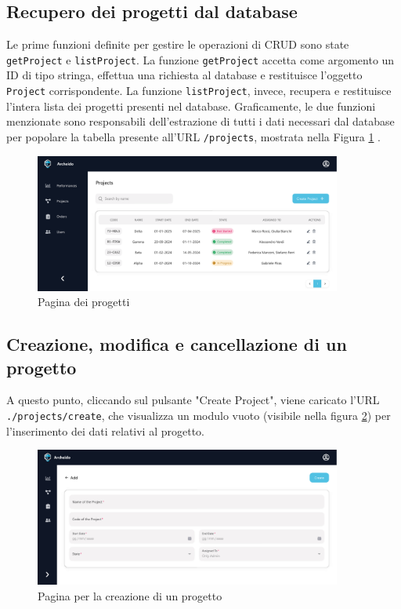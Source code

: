 \documentclass[target=bach,aauheader=,style=]{thud}
\begin{document}
\subsection{Recupero dei progetti dal database}
\noindent Le prime funzioni definite per gestire le operazioni di CRUD sono state \texttt{getProject} e \texttt{listProject}. La funzione \texttt{getProject} accetta come argomento un ID di tipo stringa, effettua una richiesta al database e restituisce l'oggetto \texttt{Project} corrispondente. La funzione \texttt{listProject}, invece, recupera e restituisce l'intera lista dei progetti presenti nel database. Graficamente, le due funzioni menzionate sono responsabili dell'estrazione di tutti i dati necessari dal database per popolare la tabella presente all'URL \texttt{/projects}, mostrata nella Figura \ref{get_projects} .

\begin{figure}[H]
    \centering
    \includegraphics[width=0.9\textwidth]{img/interfacce/table_project.pdf} 
    \caption{Pagina dei progetti}
    \label{get_projects}
\end{figure}

\subsection{Creazione, modifica e cancellazione di un progetto}
A questo punto, cliccando sul pulsante "Create Project", viene caricato l'URL \texttt{./projects/create}, che visualizza un modulo vuoto (visibile nella figura \ref{create_projects}) per l'inserimento dei dati relativi al progetto. 

\begin{figure}[H]
    \centering
    \includegraphics[width=0.9\textwidth]{img/interfacce/table_add.pdf} 
    \caption{Pagina per la creazione di un progetto}
    \label{create_projects}
\end{figure}
\end{document}
